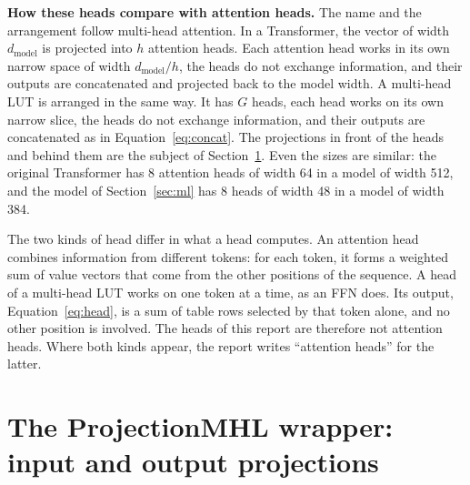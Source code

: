 \documentclass[11pt]{article}
\begin{document}
\textbf{How these heads compare with attention heads.} The name and the arrangement follow multi-head
attention. In a Transformer, the vector of width $d_\text{model}$ is projected into $h$ attention heads.
Each attention head works in its own narrow space of width $d_\text{model}/h$, the heads do not exchange
information, and their outputs are concatenated and projected back to the model width. A multi-head LUT
is arranged in the same way. It has $G$ heads, each head works on its own narrow slice, the heads do not
exchange information, and their outputs are concatenated as in Equation~\eqref{eq:concat}. The
projections in front of the heads and behind them are the subject of Section~\ref{sec:projection}. Even
the sizes are similar: the original Transformer has 8 attention heads of width 64 in a model of width
512, and the model of Section~\ref{sec:ml} has 8 heads of width 48 in a model of width 384.

The two kinds of head differ in what a head computes. An attention head combines information from different
tokens: for each token, it forms a weighted sum of value vectors that come from the other positions of
the sequence. A head of a multi-head LUT works on one token at a time, as an FFN does. Its output,
Equation~\eqref{eq:head}, is a sum of table rows selected by that token alone, and no other position is
involved. The heads of this report are therefore not attention heads. Where both kinds appear, the
report writes ``attention heads'' for the latter.

\section{The ProjectionMHL wrapper: input and output projections}
\label{sec:projection}
\end{document}
